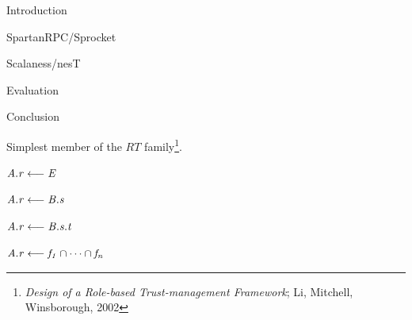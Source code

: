 
\begin{cenumerate}
\item Introduction
\item {}
\item SpartanRPC/Sprocket
\item Scalaness/nesT
\item Evaluation
\item Conclusion
\end{cenumerate}
\stopslide


\centerline{}
\stopslide


Simplest member of the $RT$ family\footnote{\textit{Design of a Role-based Trust-management
    Framework}; Li, Mitchell, Winsborough, 2002}.
\begin{cenumerate}
\item $\mathit{A.r} \stackrel{}{\longleftarrow} \mathit{E}$ 
\item $\mathit{A.r} \stackrel{}{\longleftarrow} \mathit{B.s}$ 
\item $\mathit{A.r} \stackrel{}{\longleftarrow} \mathit{B.s.t}$ 
\item $\mathit{A.r} \stackrel{}{\longleftarrow} \mathit{f_1 \cap \cdots \cap f_n}$
\end{cenumerate}
\stopslide


